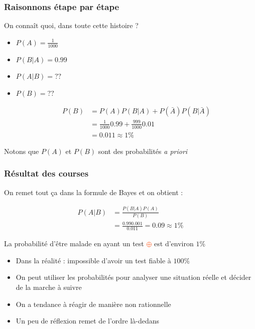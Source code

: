 \documentclass[usenames, dvipsnames]{beamer}
\newcommand{\positif}{\textcolor{OrangeRed}{$\oplus$} }
\begin{document}
\begin{frame}[plain]
\frametitle{Raisonnons étape par étape}

On connaît quoi, dans toute cette histoire ?

\begin{itemize}
\item $P(A) = \frac{1}{1000}$ \pause
\item $P(B|A) = 0.99$ \pause
\item $P(A|B) = ??$ \pause
\item $P(B) = ??$ \pause

\begin{align*}P(B) &= P(A)P(B|A) + P(\bar{A})P(B|\bar{A})\\
&=\frac{1}{1000}0.99 + \frac{999}{1000}0.01\\
&= 0.011 \approx 1\%\end{align*}

\end{itemize}

Notons que $P(A)$ et $P(B)$ sont des probabilités \textit{a priori}

\end{frame}





\begin{frame}[plain]
\frametitle{Résultat des courses}

On remet tout ça dans la formule de Bayes et on obtient :

\begin{align*}
P(A|B) &= \frac{P(B|A)P(A)}{P(B)}\\
&= \frac{0.99 0.001}{0.011} = 0.09 \approx 1\%
\end{align*}


\pause
La probabilité d'être malade en ayant un test \positif est d'environ $1\%$

\pause

\begin{itemize}
\item Dans la réalité : impossible d'avoir un test fiable à $100\%$ \pause
\item On peut utiliser les probabilités pour analyser une situation réelle et décider de la marche à suivre \pause
\item On a tendance à réagir de manière non rationnelle\pause
\item Un peu de réflexion remet de l'ordre là-dedans\pause
\end{itemize}


\end{frame}
\end{document}
